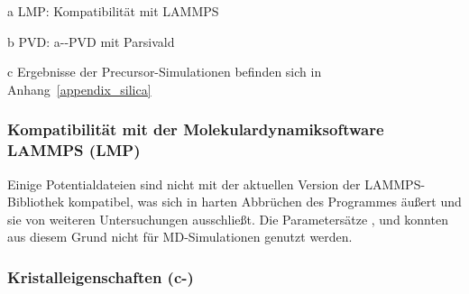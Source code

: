 \begin{table}[th]
\begin{threeparttable}

    \begin{tablenotes}[para]
      \item[a] LMP: Kompatibilität mit LAMMPS
      \item[b] PVD: a--PVD mit Parsivald
      \item[c] Ergebnisse der Precursor-Simulationen befinden sich in Anhang~\ref{appendix_silica}
    \end{tablenotes}
  \end{threeparttable}
\end{table}

\subsubsection{Kompatibilität mit der Molekulardynamiksoftware LAMMPS (LMP)}

Einige Potentialdateien sind nicht mit der aktuellen Version der LAMMPS-Bibliothek kompatibel, was sich in harten Abbrüchen des Programmes äußert und sie von weiteren Untersuchungen ausschließt.
Die Parametersätze ,  und  konnten aus diesem Grund nicht für MD-Simulationen genutzt werden.

\subsubsection{Kristalleigenschaften (c-)}

